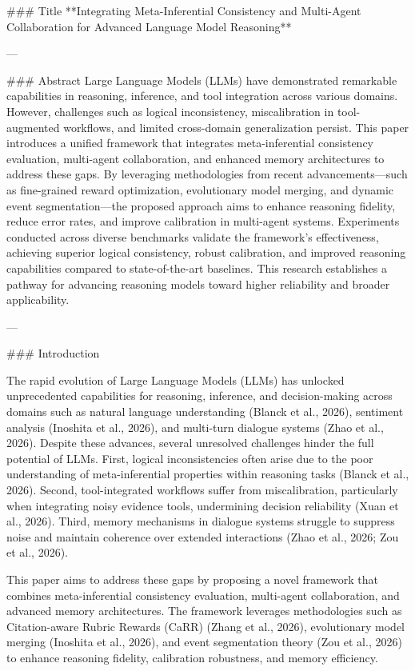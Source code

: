 ### Title
**Integrating Meta-Inferential Consistency and Multi-Agent Collaboration for Advanced Language Model Reasoning**

---

### Abstract  
Large Language Models (LLMs) have demonstrated remarkable capabilities in reasoning, inference, and tool integration across various domains. However, challenges such as logical inconsistency, miscalibration in tool-augmented workflows, and limited cross-domain generalization persist. This paper introduces a unified framework that integrates meta-inferential consistency evaluation, multi-agent collaboration, and enhanced memory architectures to address these gaps. By leveraging methodologies from recent advancements—such as fine-grained reward optimization, evolutionary model merging, and dynamic event segmentation—the proposed approach aims to enhance reasoning fidelity, reduce error rates, and improve calibration in multi-agent systems. Experiments conducted across diverse benchmarks validate the framework's effectiveness, achieving superior logical consistency, robust calibration, and improved reasoning capabilities compared to state-of-the-art baselines. This research establishes a pathway for advancing reasoning models toward higher reliability and broader applicability.

---

### Introduction  

The rapid evolution of Large Language Models (LLMs) has unlocked unprecedented capabilities for reasoning, inference, and decision-making across domains such as natural language understanding (Blanck et al., 2026), sentiment analysis (Inoshita et al., 2026), and multi-turn dialogue systems (Zhao et al., 2026). Despite these advances, several unresolved challenges hinder the full potential of LLMs. First, logical inconsistencies often arise due to the poor understanding of meta-inferential properties within reasoning tasks (Blanck et al., 2026). Second, tool-integrated workflows suffer from miscalibration, particularly when integrating noisy evidence tools, undermining decision reliability (Xuan et al., 2026). Third, memory mechanisms in dialogue systems struggle to suppress noise and maintain coherence over extended interactions (Zhao et al., 2026; Zou et al., 2026).  

This paper aims to address these gaps by proposing a novel framework that combines meta-inferential consistency evaluation, multi-agent collaboration, and advanced memory architectures. The framework leverages methodologies such as Citation-aware Rubric Rewards (CaRR) (Zhang et al., 2026), evolutionary model merging (Inoshita et al., 2026), and event segmentation theory (Zou et al., 2026) to enhance reasoning fidelity, calibration robustness, and memory efficiency.  

